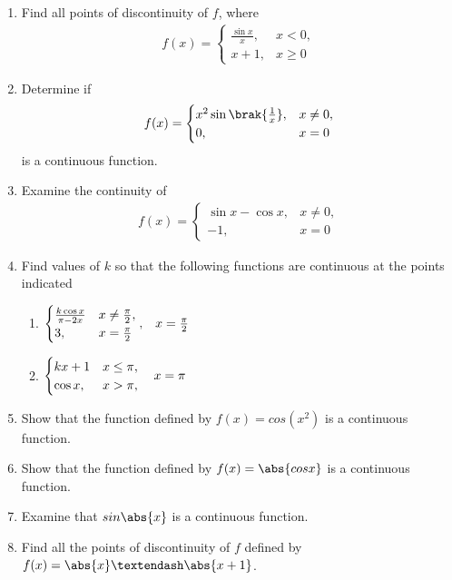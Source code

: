 \begin{enumerate}[label=\arabic*.,ref=\thesubsection.\theenumi]
\item Find all points of discontinuity of $f$, where 
\begin{align}
f(x)=
\begin{cases}
\frac{\sin x}{x}, & x < 0,
\\
x+1, & x \ge 0
\end{cases}
\end{align}
\item Determine if 
\begin{align}
f(x)=
\begin{cases}
x^2\sin \brak{\frac{1}{x}}, & x \ne 0,
\\
0, & x = 0
\end{cases}
\end{align}
%
is a continuous function.
\item Examine the continuity of 
\begin{align}
f(x)=
\begin{cases}
\sin x -\cos x, & x \ne 0,
\\
-1, & x = 0
\end{cases}
\end{align}
%
\item Find values of $k$ so that the following functions are continuous at the points indicated
%
\begin{enumerate}
\item 
$
\begin{alignedat}[t]{2}
\begin{cases}
\frac{k\cos x}{\pi - 2x} & x \ne \frac{\pi}{2},
\\
3, & x = \frac{\pi}{2}
\end{cases},
\end{alignedat}
\quad x = \frac{\pi}{2}
$
\item 
$
\begin{alignedat}[t]{2}
\begin{cases}
kx+1 & x \le \pi, 
\\
\cos x, & x > \pi,
\end{cases}
\quad x = \pi
\end{alignedat}
$
\end{enumerate}
%
\item Show that the function defined by $f(x) = cos (x^2 )$ is a continuous function.
\item  Show that the function defined by $f(x) = \abs{ cos x} $ is a continuous function. 
\item  Examine that $sin \abs{ x}$ is a continuous function. 
\item  Find all the points of discontinuity of $f$ defined by $f(x) = \abs{ x} – \abs{ x + 1 }$.

\end{enumerate}

